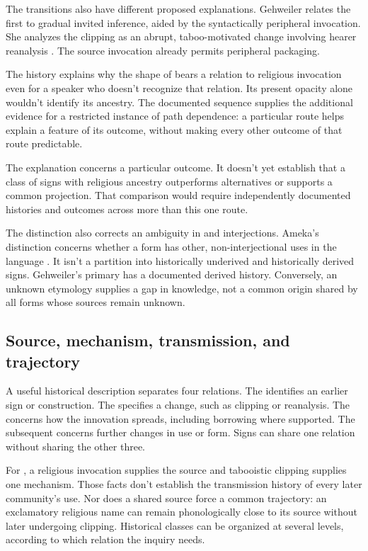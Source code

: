 \documentclass[12pt]{article}
\begin{document}
The transitions also have different proposed explanations. Gehweiler
relates the first to gradual invited inference, aided by the syntactically
peripheral invocation. She analyzes the clipping as an abrupt, taboo-motivated
change involving hearer reanalysis \citep[84--88]{gehweiler2008}. The
source invocation already permits peripheral packaging.

The history explains why the shape of  bears a relation
to religious invocation even for a speaker who doesn't recognize that
relation. Its present opacity alone wouldn't identify its ancestry.
The documented sequence supplies the additional evidence for a
restricted instance of path dependence: a particular route helps explain
a feature of its outcome, without making every other outcome of that
route predictable.

The explanation concerns a particular outcome. It doesn't yet establish
that a class of signs with religious ancestry outperforms alternatives
or supports a common projection. That comparison would require independently
documented histories and outcomes across more than this one route.

The distinction also corrects an ambiguity in  and
 interjections. Ameka's distinction concerns whether
a form has other, non-interjectional uses in the language
\citep[105--106]{ameka1992}. It isn't a partition into historically
underived and historically derived signs. Gehweiler's primary
 has a documented derived history. Conversely, an unknown
etymology supplies a gap in knowledge, not a common origin shared by
all forms whose sources remain unknown.

\subsection{Source, mechanism, transmission, and trajectory}

A useful historical description separates four relations. The
 identifies an earlier sign or construction. The
 specifies a change, such as clipping or reanalysis.
The  concerns how the innovation spreads,
including borrowing where supported. The subsequent 
concerns further changes in use or form. Signs can share one relation
without sharing the other three.

For , a religious invocation supplies the source and
tabooistic clipping supplies one mechanism. Those facts don't establish
the transmission history of every later community's use. Nor does a
shared source force a common trajectory: an exclamatory religious name
can remain phonologically close to its source without later undergoing
clipping. Historical classes can be organized at several
levels, according to which relation the inquiry needs.
\end{document}
